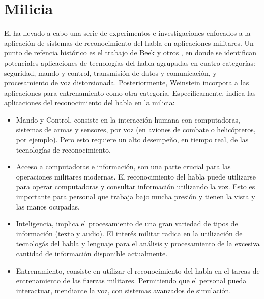 \section{Milicia}
\label{sec:milicia}

El  ha llevado a cabo una serie de experimentos e investigaciones
enfocados a la aplicaci\'on de sistemas de reconocimiento del habla en aplicaciones militares.
Un punto de refencia hist\'orico  es el
trabajo de Beek y otros \cite{BeekAn1977}, en donde se identifican potenciales aplicaciones
de tecnolog\'ias del habla agrupadas en cuatro categor\'ias: seguridad, mando y control, transmisi\'on de datos y comunicaci\'on, y
procesamiento de voz distorsionada. Posteriormente, Weinstein \cite{WeinsteinOpportunities1991} incorpora
a las aplicaciones para entrenamiento como otra categor\'ia. Espec\'ificamente, \cite{PigeonUse2006} indica
las aplicaciones del reconocimiento del habla en la milicia:

\begin{itemize}
    \item Mando y Control, consiste en la interacci\'on humana con computadoras, sistemas
	de armas y sensores, por voz (en aviones de combate o helic\'opteros, por ejemplo). Pero esto
	requiere un alto desempe\~no, en tiempo real, de las tecnolog\'ias de reconocimiento.
    \item Acceso a computadoras e informaci\'on, son una parte crucial para las operaciones militares modernas. El
	reconocimiento del habla puede utilizarse para operar computadoras y consultar informaci\'on utilizando la voz. Esto
	es importante para personal que trabaja bajo mucha presi\'on y tienen la vista y las manos ocupadas.
    \item Inteligencia, implica el procesamiento de una gran variedad de tipos de informaci\'on (texto y audio). El inter\'es militar
	radica en la utilizaci\'on de tecnolog\'as del habla y lenguaje para el an\'alisis y procesamiento
	de la excesiva cantidad de informaci\'on disponible actualmente.
    \item Entrenamiento, consiste en utilizar el reconocimiento del habla en el tareas de entrenamiento de las fuerzas
	militares. Permitiendo que el personal pueda interactuar, mendiante la voz, con sistemas avanzados de simulaci\'on.
\end{itemize}
